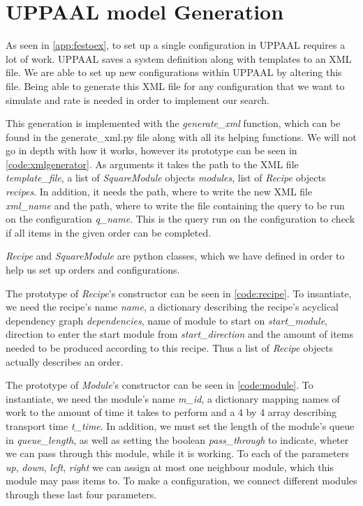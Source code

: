 \section{UPPAAL model Generation}
As seen in \cref{app:festoex}, to set up a single configuration in UPPAAL requires a lot of work. UPPAAL saves a system definition along with templates to an XML file. We are able to set up new configurations within UPPAAL by altering this file. Being able to generate this XML file for any configuration that we want to simulate and rate is needed in order to implement our search.

This generation is implemented with the \textit{generate\_xml} function, which can be found in the generate\_xml.py file along with all its helping functions. We will not go in depth with how it works, however its prototype can be seen in \cref{code:xmlgenerator}. As arguments it takes the path to the XML file \textit{template\_file}, a list of \textit{SquareModule} objects \textit{modules}, list of \textit{Recipe} objects \textit{recipes}. In addition, it needs the path, where to write the new XML file \textit{xml\_name} and the path, where to write the file containing the query to be run on the configuration \textit{q\_name}. This is the query run on the configuration to check if all items in the given order can be completed. 



\textit{Recipe} and \textit{SquareModule} are python classes, which we have defined in order to help us set up orders and configurations. 

The prototype of \textit{Recipe}'s constructor can be seen in \cref{code:recipe}. To insantiate, we need the recipe's name \textit{name}, a dictionary describing the recipe's acyclical dependency graph \textit{dependencies}, name of module to start on \textit{start\_module}, direction to enter the start module from \textit{start\_direction} and the amount of items needed to be produced according to this recipe. Thus a list of \textit{Recipe} objects actually describes an order.



The prototype of \textit{Module}'s constructor can be seen in \cref{code:module}. To instantiate, we need the module's name \textit{m\_id}, a dictionary mapping names of work to the amount of time it takes to perform and a 4 by 4 array describing transport time \textit{t\_time}. In addition, we must set the length of the module's queue in \textit{queue\_length}, as well as setting the boolean \textit{pass\_through} to indicate, wheter we can pass through this module, while it is working. To each of the parameters \textit{up}, \textit{down}, \textit{left}, \textit{right} we can assign at most one neighbour module, which this module may pass items to. To make a configuration, we connect different modules through these last four parameters.

